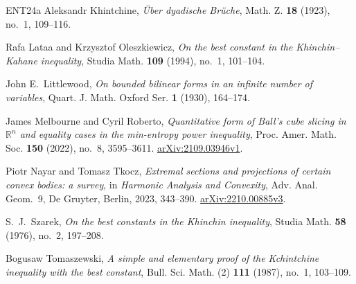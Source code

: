 \documentclass[a4paper,twoside,11pt,reqno]{amsart}
\theoremstyle{definition}
\theoremstyle{remark}
\newcommand{\1}{\mathbbm{1}}
\begin{document}
\begin{thebibliography}{ENT24a}
Aleksandr Khintchine,
\emph{\"Uber dyadische Br\"uche},
Math. Z. \textbf{18} (1923), no.~1, 109--116.

Rafa{} Lata{}a and Krzysztof Oleszkiewicz,
\emph{On the best constant in the Khinchin--Kahane inequality},
Studia Math. \textbf{109} (1994), no.~1, 101--104.

John E.~Littlewood,
\emph{On bounded bilinear forms in an infinite number of variables},
Quart. J. Math. Oxford Ser. \textbf{1} (1930), 164--174.

James Melbourne and Cyril Roberto,
\emph{Quantitative form of Ball's cube slicing in $\mathbb R^n$ and equality cases in the min-entropy power inequality},
Proc. Amer. Math. Soc. \textbf{150} (2022), no.~8, 3595--3611.
\href{https://arxiv.org/abs/2109.03946v1}{arXiv:2109.03946v1}.

Piotr Nayar and Tomasz Tkocz,
\emph{Extremal sections and projections of certain convex bodies: a survey},
in \emph{Harmonic Analysis and Convexity}, Adv. Anal. Geom.~9,
De Gruyter, Berlin, 2023, 343--390.
\href{https://arxiv.org/abs/2210.00885v3}{arXiv:2210.00885v3}.

S.~J.~Szarek,
\emph{On the best constants in the Khinchin inequality},
Studia Math. \textbf{58} (1976), no.~2, 197--208.

Bogus{}aw Tomaszewski,
\emph{A simple and elementary proof of the Kchintchine inequality with the best constant},
Bull. Sci. Math. (2) \textbf{111} (1987), no.~1, 103--109.
\end{thebibliography}
\end{document}
